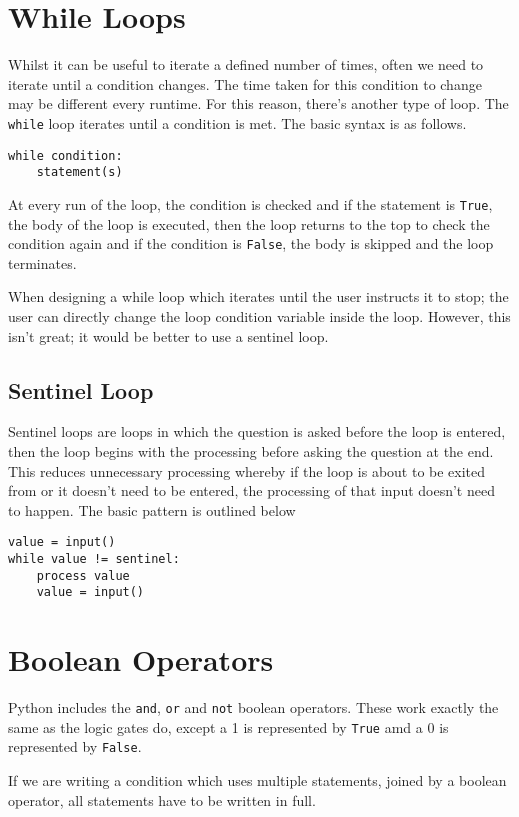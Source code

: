 
\section*{While Loops}
Whilst it can be useful to iterate a defined number of times, often we need to iterate until a condition changes. The time taken for this condition to change may be different every runtime. For this reason, there's another type of loop. The \texttt{while} loop iterates until a condition is met. The basic syntax is as follows.
\begin{verbatim}
while condition:
    statement(s)
\end{verbatim}
At every run of the loop, the condition is checked and if the statement is \texttt{True}, the body of the loop is executed, then the loop returns to the top to check the condition again and if the condition is \texttt{False}, the body is skipped and the loop terminates.

When designing a while loop which iterates until the user instructs it to stop; the user can directly change the loop condition variable inside the loop. However, this isn't great; it would be better to use a sentinel loop.
\subsection*{Sentinel Loop}
Sentinel loops are loops in which the question is asked before the loop is entered, then the loop begins with the processing before asking the question at the end. This reduces unnecessary processing whereby if the loop is about to be exited from or it doesn't need to be entered, the processing of that input doesn't need to happen. The basic pattern is outlined below
\begin{verbatim}
value = input()
while value != sentinel:
    process value
    value = input()
\end{verbatim}

\section*{Boolean Operators}
Python includes the \texttt{and}, \texttt{or} and \texttt{not} boolean operators. These work exactly the same as the logic gates do, except a 1 is represented by \texttt{True} amd a 0 is represented by \texttt{False}.

If we are writing a condition which uses multiple statements, joined by a boolean operator, all statements have to be written in full.

